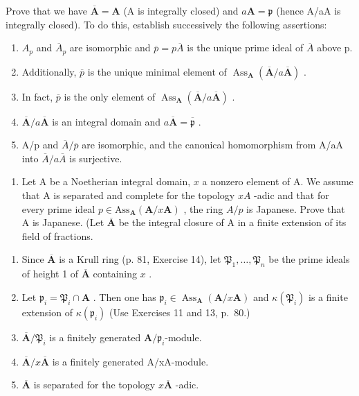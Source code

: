 Prove that we have \(\overline{\mathbf{A}} = \mathbf{A}\) (A is integrally closed) and \(a\mathbf{A} = \mathfrak{p}\) (hence A/aA is integrally closed). To do this, establish successively the following assertions:

\begin{enumerate}
\def\labelenumi{\alph{enumi})}
\item
  \(A_{p}\) and \(\overline{A}_{p}\) are isomorphic and \(\overline{p} = p\overline{A}\) is the unique prime ideal of \(\overline{A}\) above p.
\item
  Additionally, \(\overline{p}\) is the unique minimal element of \(\operatorname{Ass}_{\mathbf{A}}(\overline{\mathbf{A}}/a\overline{\mathbf{A}})\) .
\item
  In fact, \(\overline{p}\) is the only element of \(\operatorname{Ass}_{\mathbf{A}}(\overline{\mathbf{A}}/a\overline{\mathbf{A}})\) .
\item
  \(\overline{\mathbf{A}} / a\overline{\mathbf{A}}\) is an integral domain and \(a\overline{\mathbf{A}} = \overline{\mathfrak{p}}\) .
\item
  A/p and \(\overline{A}/\overline{p}\) are isomorphic, and the canonical homomorphism from A/aA into \(\overline{A}/a\overline{A}\) is surjective.
\end{enumerate}

\begin{enumerate}
\def\labelenumi{\arabic{enumi})}
\setcounter{enumi}{17}
\tightlist
\item
  Let A be a Noetherian integral domain, \(x\) a nonzero element of A. We assume that A is separated and complete for the topology \(xA\) -adic and that for every prime ideal \(p \in \mathrm{Ass}_{\mathbf{A}}(\mathbf{A} / x\mathbf{A})\) , the ring \(A/p\) is Japanese. Prove that A is Japanese. (Let \(\overline{\mathbf{A}}\) be the integral closure of A in a finite extension of its field of fractions.
\end{enumerate}

\begin{enumerate}
\def\labelenumi{\alph{enumi})}
\item
  Since \(\overline{\mathbf{A}}\) is a Krull ring (p. 81, Exercise 14), let \(\mathfrak{P}_1, \ldots, \mathfrak{P}_n\) be the prime ideals of height 1 of \(\overline{\mathbf{A}}\) containing \(x\) .
\item
  Let \(\mathfrak{p}_i = \mathfrak{P}_i \cap \mathbf{A}\) . Then one has \(\mathfrak{p}_i \in \operatorname{Ass}_{\mathbf{A}}(\mathbf{A} / x\mathbf{A})\) and \(\kappa(\mathfrak{P}_i)\) is a finite extension of \(\kappa(\mathfrak{p}_i)\) (Use Exercises 11 and 13, p.~80.)
\item
  \(\overline{\mathbf{A}} / \mathfrak{P}_i\) is a finitely generated \(\mathbf{A} / \mathfrak{p}_i\)-module.
\item
  \(\overline{\mathbf{A}} / x\overline{\mathbf{A}}\) is a finitely generated A/xA-module.
\item
  \(\overline{\mathbf{A}}\) is separated for the topology \(x\overline{\mathbf{A}}\) -adic.
\end{enumerate}

